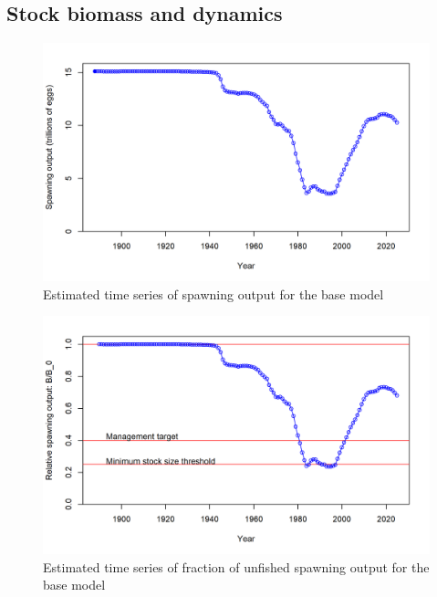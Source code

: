 \documentclass[
]{scrartcl}
\begin{document}
\hypertarget{stock-biomass-and-dynamics}{%
\subsection*{Stock biomass and
dynamics}\label{stock-biomass-and-dynamics}}

\clearpage 


\begin{figure}

{\centering \includegraphics[width=6in,height=\textheight]{r4ss_plots/ts7_Spawning_output.png}

}

\caption{\label{fig-es-ssb}Estimated time series of spawning output for
the base model}

\end{figure}

\begin{figure}

{\centering \includegraphics[width=6in,height=\textheight]{r4ss_plots/ts9_Relative_spawning_output.png}

}

\caption{\label{fig-es-frac-unfished}Estimated time series of fraction
of unfished spawning output for the base model}

\end{figure}
\end{document}
